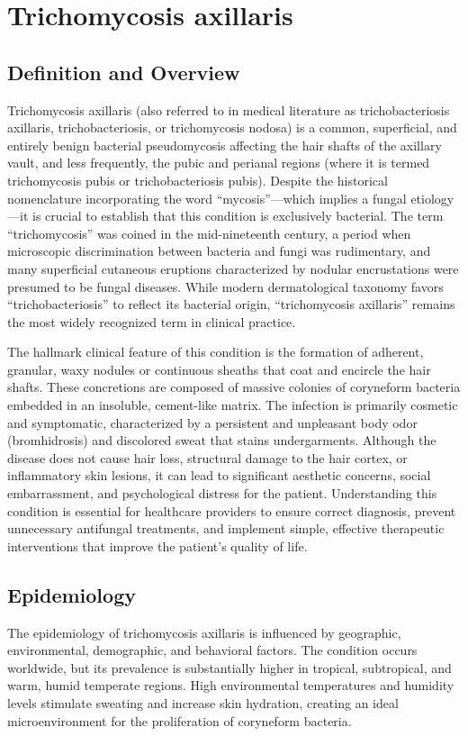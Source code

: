 \chapter{Trichomycosis axillaris}

\section*{Definition and Overview}
Trichomycosis axillaris (also referred to in medical literature as trichobacteriosis axillaris, trichobacteriosis, or trichomycosis nodosa) is a common, superficial, and entirely benign bacterial pseudomycosis affecting the hair shafts of the axillary vault, and less frequently, the pubic and perianal regions (where it is termed trichomycosis pubis or trichobacteriosis pubis). Despite the historical nomenclature incorporating the word ``mycosis''---which implies a fungal etiology---it is crucial to establish that this condition is exclusively bacterial. The term ``trichomycosis'' was coined in the mid-nineteenth century, a period when microscopic discrimination between bacteria and fungi was rudimentary, and many superficial cutaneous eruptions characterized by nodular encrustations were presumed to be fungal diseases. While modern dermatological taxonomy favors ``trichobacteriosis'' to reflect its bacterial origin, ``trichomycosis axillaris'' remains the most widely recognized term in clinical practice.

The hallmark clinical feature of this condition is the formation of adherent, granular, waxy nodules or continuous sheaths that coat and encircle the hair shafts. These concretions are composed of massive colonies of coryneform bacteria embedded in an insoluble, cement-like matrix. The infection is primarily cosmetic and symptomatic, characterized by a persistent and unpleasant body odor (bromhidrosis) and discolored sweat that stains undergarments. Although the disease does not cause hair loss, structural damage to the hair cortex, or inflammatory skin lesions, it can lead to significant aesthetic concerns, social embarrassment, and psychological distress for the patient. Understanding this condition is essential for healthcare providers to ensure correct diagnosis, prevent unnecessary antifungal treatments, and implement simple, effective therapeutic interventions that improve the patient's quality of life.

\section*{Epidemiology}
The epidemiology of trichomycosis axillaris is influenced by geographic, environmental, demographic, and behavioral factors. The condition occurs worldwide, but its prevalence is substantially higher in tropical, subtropical, and warm, humid temperate regions. High environmental temperatures and humidity levels stimulate sweating and increase skin hydration, creating an ideal microenvironment for the proliferation of coryneform bacteria.

